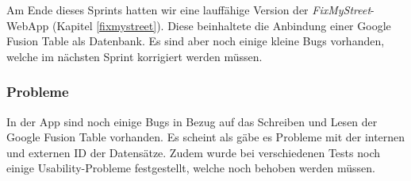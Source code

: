 Am Ende dieses Sprints hatten wir eine lauffähige Version der \emph{FixMyStreet}-WebApp (Kapitel \ref{fixmystreet}). Diese beinhaltete die Anbindung einer Google Fusion Table als Datenbank. Es sind aber noch einige kleine Bugs vorhanden, welche im nächsten Sprint korrigiert werden müssen.

\subsubsection{Probleme}
In der App sind noch einige Bugs in Bezug auf das Schreiben und Lesen der Google Fusion Table vorhanden. Es scheint als gäbe es Probleme mit der internen und externen ID der Datensätze. Zudem wurde bei verschiedenen Tests noch einige Usability-Probleme festgestellt, welche noch behoben werden müssen.